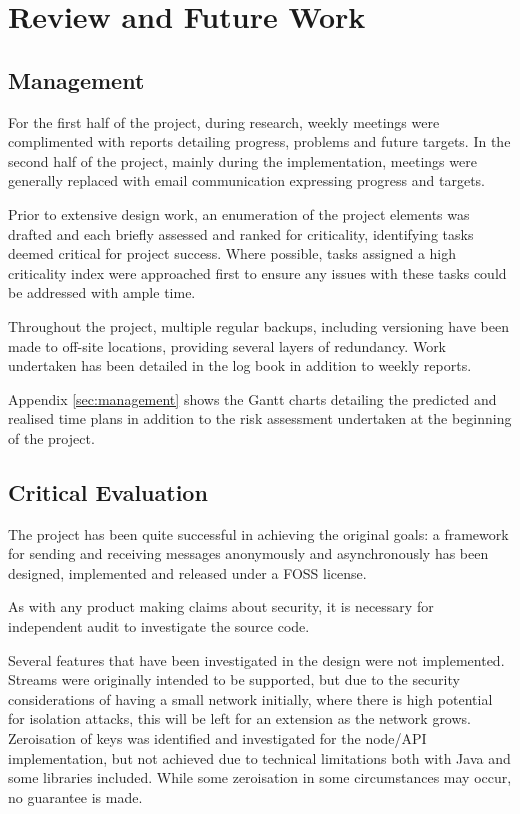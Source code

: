\section{Review and Future Work}

	\subsection{Management}
		For the first half of the project, during research, weekly meetings were complimented with reports detailing progress, problems and future targets. In the second half of the project, mainly during the implementation, meetings were generally replaced with email communication expressing progress and targets.
		
		Prior to extensive design work, an enumeration of the project elements was drafted and each briefly assessed and ranked for criticality, identifying tasks deemed critical for project success. Where possible, tasks assigned a high criticality index were approached first to ensure any issues with these tasks could be addressed with ample time.
		
		Throughout the project, multiple regular backups, including versioning have been made to off-site locations, providing several layers of redundancy. Work undertaken has been detailed in the log book in addition to weekly reports.

		Appendix \ref{sec:management} shows the Gantt charts detailing the predicted and realised time plans in addition to the risk assessment undertaken at the beginning of the project.

	\subsection{Critical Evaluation}
		The project has been quite successful in achieving the original goals: a framework for sending and receiving messages anonymously and asynchronously has been designed, implemented and released under a FOSS license. 
		
		As with any product making claims about security, it is necessary for independent audit to investigate the source code. 
		
		Several features that have been investigated in the design were not implemented. Streams were originally intended to be supported, but due to the security considerations of having a small network initially, where there is high potential for isolation attacks, this will be left for an extension as the network grows. Zeroisation of keys was identified and investigated for the node/API implementation, but not achieved due to technical limitations both with Java and some libraries included. While some zeroisation in some circumstances may occur, no guarantee is made.
		
